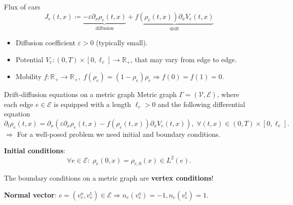 \documentclass[9pt]{beamer}
\begin{document}
\begin{frame}{Flux of cars}
    \begin{equation*} 
        J_e \left( t,x \right)  \coloneqq \underbrace{- \varepsilon \partial_x \rho_e  \left( t, x \right)}_{\text{diffusion}}  + \underbrace{f \left( \rho_e \left( t, x \right)  \right)  \partial_x V_e \left( t, x \right)}_{\text{drift}} 
    \end{equation*}
    \vspace{3mm}
    \begin{itemize}
        \item Diffusion coefficient $\varepsilon > 0$ (typically small).
        \item Potential $V_e \colon  \left( 0,T \right)  \times \left[ 0, \ell_e \right] \to \mathbb{R}_{+}$, that may vary from edge to edge.
        \item Mobility $f \colon \mathbb{R}_{+} \to \mathbb{R}_{+}, \; f \left( \rho_e \right)  =  \left( 1-\rho_e \right)  \rho_e \Rightarrow f \left( 0 \right)  = f \left( 1 \right)  = 0$. 
    \end{itemize}
\end{frame}



\begin{frame}{Drift-diffusion equations on a metric graph}
    Metric graph $\Gamma =  \left( \mathcal{V}, \mathcal{E} \right) $, where each edge $e \in \mathcal{E}$ is equipped with a length $\ell_e > 0$ and the following differential equation
    \begin{equation*} 
        \partial_t \rho_e  \left( t,x \right)  = \partial_x  \left( \varepsilon \partial_x \rho_e  \left( t,x \right)  - f \left( \rho_e  \left( t,x \right)   \right)  \partial_x V_e  \left( t,x \right)  \right), \; \forall \left( t,x \right) \in \left(0, T \right) \times \left[0, \ell_e \right].
    \end{equation*}
    $\Rightarrow$ For a well-posed problem we need initial and boundary conditions.

    \vspace{5mm}

    \textbf{Initial conditions}:
    \begin{equation*}
        \forall e \in \mathcal{E} \colon \; \rho_e \left( 0,x \right)  = \rho_{e, 0} \left( x \right) \in L^2 \left( e \right).
    \end{equation*}

    \vspace{3mm}

    The boundary conditions on a metric graph are \textbf{vertex conditions}!

    \vspace{3mm}

    \textbf{Normal vector}: $e = \left( v^{\operatorname{o}}_e, v^{\operatorname{t}}_e \right) \in \mathcal{E} \Rightarrow n_e \left( v^{\operatorname{o}}_e \right)  = -1, n_e \left( v^{\operatorname{t}}_e \right)  = 1$. \\

\end{frame}
\end{document}
